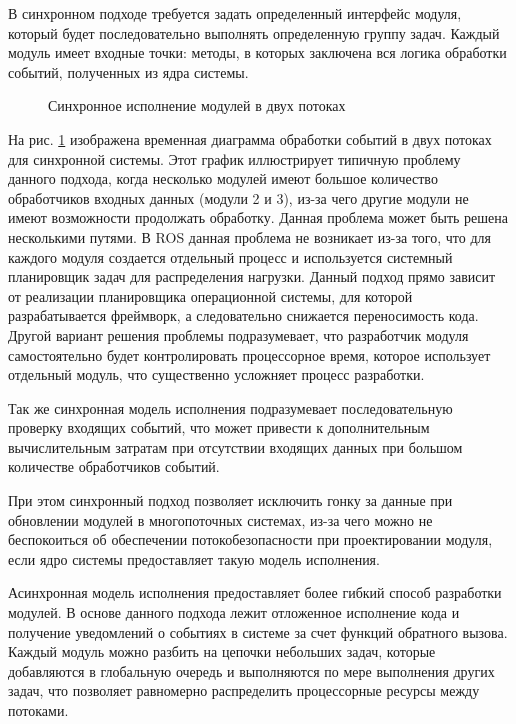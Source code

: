 В синхронном подходе требуется задать определенный интерфейс модуля, который будет последовательно выполнять определенную группу задач. Каждый модуль имеет входные точки: методы, в которых заключена вся логика обработки событий, полученных из ядра системы.

\begin{figure}[h]
    \caption{Синхронное исполнение модулей в двух потоках}
    \label{im:2_1_1_sync}
\end{figure}

На рис. \ref{im:2_1_1_sync} изображена временная диаграмма обработки событий в двух потоках для синхронной системы. Этот график иллюстрирует типичную проблему данного подхода, когда несколько модулей имеют большое количество обработчиков входных данных (модули 2 и 3), из-за чего другие модули не имеют возможности продолжать обработку. Данная проблема может быть решена несколькими путями. В ROS данная проблема не возникает из-за того, что для каждого модуля создается отдельный процесс и используется системный планировщик задач для распределения нагрузки. Данный подход прямо зависит от реализации планировщика операционной системы, для которой разрабатывается фреймворк, а следовательно снижается переносимость кода. Другой вариант решения проблемы подразумевает, что разработчик модуля самостоятельно будет контролировать процессорное время, которое использует отдельный модуль, что существенно усложняет процесс разработки.

Так же синхронная модель исполнения подразумевает последовательную проверку входящих событий, что может привести к дополнительным вычислительным затратам при отсутствии входящих данных при большом количестве обработчиков событий.

При этом синхронный подход позволяет исключить гонку за данные 
при обновлении модулей в многопоточных системах, из-за чего 
можно не беспокоиться об обеспечении потокобезопасности при 
проектировании модуля, если ядро системы предоставляет такую 
модель исполнения.

Асинхронная модель исполнения предоставляет более гибкий способ разработки модулей. В основе данного подхода лежит отложенное исполнение кода и получение уведомлений о событиях в системе за счет функций обратного вызова. Каждый модуль можно разбить на цепочки небольших задач, которые добавляются в глобальную очередь и выполняются по мере выполнения других задач, что позволяет равномерно распределить процессорные ресурсы между потоками.

